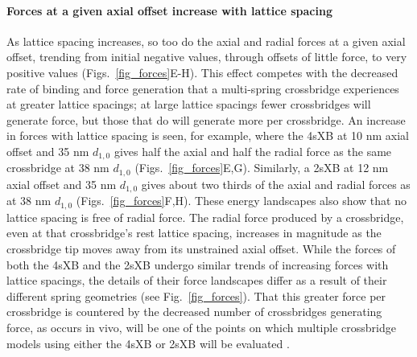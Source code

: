 \documentclass[]{article}
\begin{document}
\paragraph{Forces at a given axial offset increase with lattice spacing} %
As lattice spacing increases, so too do the axial and radial forces at a given axial offset, trending from initial negative values, through offsets of little force, to very positive values (Figs.~\ref{fig_forces}E-H). 
This effect competes with the decreased rate of binding and force generation that a multi-spring crossbridge experiences at greater lattice spacings; at large lattice spacings fewer crossbridges will generate force, but those that do will generate more per crossbridge. 
An increase in forces with lattice spacing is seen, for example, where the 4sXB at 10 nm axial offset and 35 nm $d_{1,0}$ gives half the axial and half the radial force as the same crossbridge at 38 nm $d_{1,0}$ (Figs.~\ref{fig_forces}E,G). 
Similarly, a 2sXB at 12 nm axial offset and 35 nm $d_{1,0}$ gives about two thirds of the axial and radial forces as at 38 nm $d_{1,0}$ (Figs.~\ref{fig_forces}F,H).  
These energy landscapes also show that no lattice spacing is free of radial force.
The radial force produced by a crossbridge, even at that crossbridge's rest lattice spacing, increases in magnitude as the crossbridge tip moves away from its unstrained axial offset. 
While the forces of both the 4sXB and the 2sXB undergo similar trends of increasing forces with lattice spacings, the details of their force landscapes differ as a result of their different spring geometries (see Fig.~\ref{fig_forces}). 
That this greater force per crossbridge is countered by the decreased number of crossbridges generating force, as occurs in vivo, will be one of the points on which multiple crossbridge models using either the 4sXB or 2sXB will be evaluated \citep{Martyn2004}. 
\end{document}
